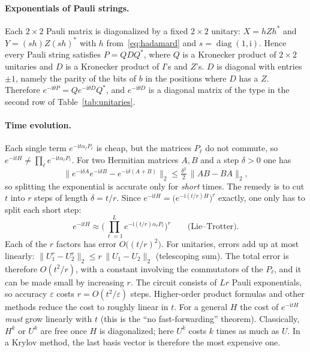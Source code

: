 \documentclass[11pt,a4paper]{article}
\begin{document}
\paragraph{Exponentials of Pauli strings.} Each $2\times2$ Pauli matrix is
diagonalized by a fixed $2\times2$ unitary: $X=hZh^*$ and $Y=(sh)Z(sh)^*$
with $h$ from~\eqref{eq:hadamard} and $s=\operatorname{diag}(1,\mathrm{i})$. Hence every Pauli string satisfies
$P=QDQ^*$, where $Q$ is a Kronecker product of $2\times2$ unitaries and
$D$ is a Kronecker product of $I$'s and $Z$'s. $D$ is diagonal with
entries $\pm1$, namely the parity of the bits of $b$ in the positions
where $D$ has a $Z$. Therefore $e^{-\mathrm{i}\theta P}=Qe^{-\mathrm{i}\theta
D}Q^*$, and $e^{-\mathrm{i}\theta D}$ is a diagonal matrix of the type in the
second row of Table~\ref{tab:unitaries}.

\paragraph{Time evolution.} Each single term $e^{-\mathrm{i}t\alpha_\ell P_\ell}$ is cheap, but
the matrices $P_\ell$ do not commute, so
$e^{-\mathrm{i}tH}\neq\prod_\ell e^{-\mathrm{i}t\alpha_\ell P_\ell}$. For two Hermitian
matrices $A,B$ and a step $\delta>0$ one has
\[
  \big\|e^{-\mathrm{i}\delta A}e^{-\mathrm{i}\delta B}-e^{-\mathrm{i}\delta(A+B)}\big\|_2
  \le \tfrac{\delta^2}{2}\,\big\|AB-BA\big\|_2 ,
\]
so splitting the exponential is accurate only for \emph{short} times.
The remedy is to cut $t$ into $r$ steps of length $\delta=t/r$. Since
$e^{-\mathrm{i}tH}=\big(e^{-\mathrm{i}(t/r)H}\big)^r$ exactly, one only has to split each short
step:
\[
  e^{-\mathrm{i}tH}\approx\Big(\prod_{\ell=1}^L e^{-\mathrm{i}(t/r)\alpha_\ell P_\ell}\Big)^r
  \qquad\text{(Lie--Trotter)}.
\]
Each of the $r$ factors has error $O\big((t/r)^2\big)$. For unitaries,
errors add up at most linearly: $\|U_1^r-U_2^r\|_2\le r\,\|U_1-U_2\|_2$
(telescoping sum). The total error is therefore $O(t^2/r)$, with a
constant involving the commutators of the $P_\ell$, and it can be made
small by increasing $r$. The circuit consists of $Lr$ Pauli
exponentials, so accuracy $\varepsilon$ costs $r=O(t^2/\varepsilon)$ steps.
Higher-order product formulas and other
methods reduce the cost to roughly linear in $t$. For a general $H$ the
cost of $e^{-\mathrm{i}tH}$ \emph{must} grow linearly with $t$ (this is the
``no fast-forwarding'' theorem). Classically, $H^k$ or $U^k$ are free once
$H$ is diagonalized; here $U^k$ costs $k$ times as much as $U$. In a
Krylov method, the last basis vector is therefore the most expensive one.
\end{document}
